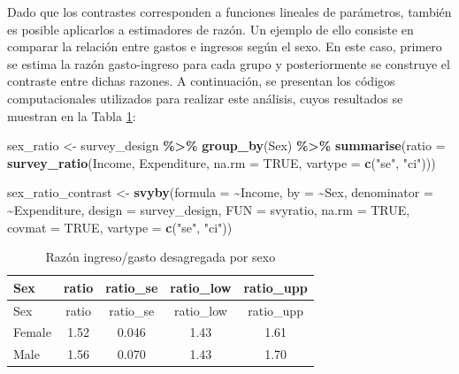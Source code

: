 \documentclass[
  spanish,
  12pt,
]{book}
\newenvironment{Shaded}{\begin{snugshade}}{\end{snugshade}}
\newcommand{\AttributeTok}[1]{\textcolor[rgb]{0.13,0.29,0.53}{#1}}
\newcommand{\ConstantTok}[1]{\textcolor[rgb]{0.56,0.35,0.01}{#1}}
\newcommand{\FunctionTok}[1]{\textcolor[rgb]{0.13,0.29,0.53}{\textbf{#1}}}
\newcommand{\NormalTok}[1]{#1}
\newcommand{\OtherTok}[1]{\textcolor[rgb]{0.56,0.35,0.01}{#1}}
\newcommand{\SpecialCharTok}[1]{\textcolor[rgb]{0.81,0.36,0.00}{\textbf{#1}}}
\newcommand{\StringTok}[1]{\textcolor[rgb]{0.31,0.60,0.02}{#1}}
\begin{document}
Dado que los contrastes corresponden a funciones lineales de parámetros, también es posible aplicarlos a estimadores de razón. Un ejemplo de ello consiste en comparar la relación entre gastos e ingresos según el sexo. En este caso, primero se estima la razón gasto-ingreso para cada grupo y posteriormente se construye el contraste entre dichas razones. A continuación, se presentan los códigos computacionales utilizados para realizar este análisis, cuyos resultados se muestran en la Tabla \ref{tab:tab-razon-ingreso-gasto-sexo}:

\begin{Shaded}
\begin{Highlighting}[]
\NormalTok{sex\_ratio }\OtherTok{\textless{}{-}}\NormalTok{ survey\_design }\SpecialCharTok{\%\textgreater{}\%}
  \FunctionTok{group\_by}\NormalTok{(Sex) }\SpecialCharTok{\%\textgreater{}\%}
  \FunctionTok{summarise}\NormalTok{(}\AttributeTok{ratio =} \FunctionTok{survey\_ratio}\NormalTok{(Income,}
\NormalTok{                                 Expenditure,}
                                 \AttributeTok{na.rm =} \ConstantTok{TRUE}\NormalTok{,}
                                 \AttributeTok{vartype =} \FunctionTok{c}\NormalTok{(}\StringTok{"se"}\NormalTok{, }\StringTok{"ci"}\NormalTok{)))}

\NormalTok{sex\_ratio\_contrast }\OtherTok{\textless{}{-}} \FunctionTok{svyby}\NormalTok{(}\AttributeTok{formula =} \SpecialCharTok{\textasciitilde{}}\NormalTok{Income,}
                            \AttributeTok{by =} \SpecialCharTok{\textasciitilde{}}\NormalTok{Sex,}
                            \AttributeTok{denominator =} \SpecialCharTok{\textasciitilde{}}\NormalTok{Expenditure,}
                            \AttributeTok{design =}\NormalTok{ survey\_design,}
                            \AttributeTok{FUN =}\NormalTok{ svyratio,}
                            \AttributeTok{na.rm =} \ConstantTok{TRUE}\NormalTok{,}
                            \AttributeTok{covmat =} \ConstantTok{TRUE}\NormalTok{,}
                            \AttributeTok{vartype =} \FunctionTok{c}\NormalTok{(}\StringTok{"se"}\NormalTok{, }\StringTok{"ci"}\NormalTok{))}
\end{Highlighting}
\end{Shaded}

\begin{longtable}[]{@{}lcccc@{}}
\caption{\label{tab:tab-razon-ingreso-gasto-sexo}Razón ingreso/gasto desagregada por sexo}\tabularnewline
\toprule\noalign{}
Sex & ratio & ratio\_se & ratio\_low & ratio\_upp \\
\midrule\noalign{}
\endfirsthead
\toprule\noalign{}
Sex & ratio & ratio\_se & ratio\_low & ratio\_upp \\
\midrule\noalign{}
\endhead
\bottomrule\noalign{}
\endlastfoot
Female & 1.52 & 0.046 & 1.43 & 1.61 \\
Male & 1.56 & 0.070 & 1.43 & 1.70 \\
\end{longtable}
\end{document}
